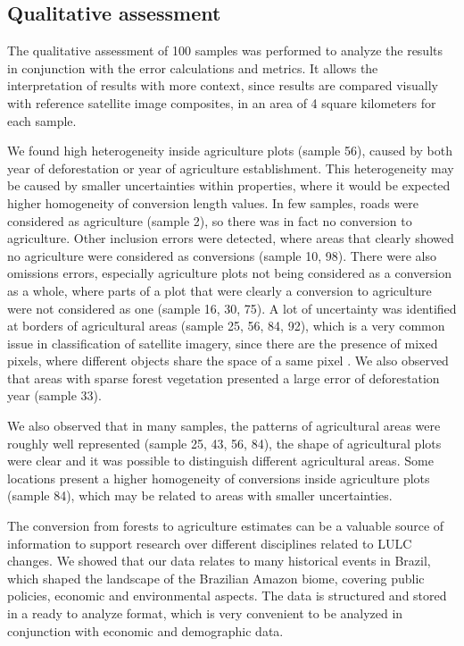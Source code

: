 \documentclass[essd, manuscript]{copernicus}
\begin{document}
\subsection{Qualitative assessment}

The qualitative assessment of 100 samples was performed to analyze the results in conjunction with the error calculations and metrics.
It allows the interpretation of results with more context, since results are compared visually with reference satellite image composites, in an area of 4 square kilometers for each sample.

We found high heterogeneity inside agriculture plots (sample 56), caused by both year of deforestation or year of agriculture establishment.
This heterogeneity may be caused by smaller uncertainties within properties, where it would be expected higher homogeneity of conversion length values.
In few samples, roads were considered as agriculture (sample 2), so there was in fact no conversion to agriculture.
Other inclusion errors were detected, where areas that clearly showed no agriculture were considered as conversions (sample 10, 98).
There were also omissions errors, especially agriculture plots not being considered as a conversion as a whole, where parts of a plot that were clearly a conversion to agriculture were not considered as one (sample 16, 30, 75).
A lot of uncertainty was identified at borders of agricultural areas (sample 25, 56, 84, 92), which is a very common issue in classification of satellite imagery, since there are the presence of mixed pixels, where different objects share the space of a same pixel \citep{Kaur2019}.
We also observed that areas with sparse forest vegetation presented a large error of deforestation year (sample 33).

We also observed that in many samples, the patterns of agricultural areas were roughly well represented (sample 25, 43, 56, 84), the shape of agricultural plots were clear and it was possible to distinguish different agricultural areas.
Some locations present a higher homogeneity of conversions inside agriculture plots (sample 84), which may be related to areas with smaller uncertainties.

\conclusions[Conclusions]

The conversion from forests to agriculture estimates can be a valuable source of information to support research over different disciplines related to LULC changes.
We showed that our data relates to many historical events in Brazil, which shaped the landscape of the Brazilian Amazon biome, covering public policies, economic and environmental aspects.
The data is structured and stored in a ready to analyze format, which is very convenient to be analyzed in conjunction with economic and demographic data.
\end{document}
